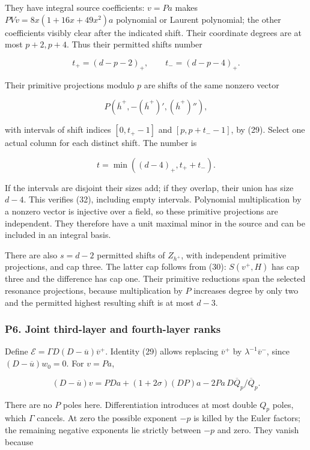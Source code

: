 \documentclass[11pt,a4paper]{article}
\begin{document}
They have integral source coefficients: \(v=Pa\) makes \(PVv=8x(1+16x+49x^{2})a\) polynomial or Laurent polynomial; the other coefficients visibly clear after the indicated shift. Their coordinate degrees are at most \(p+2,p+4\). Thus their permitted shifts number

\[
t_+=(d-p-2)_+,\qquad t_-=(d-p-4)_+.
\]

Their primitive projections modulo \(p\) are shifts of the same nonzero vector

\[
P(\overline h^+,-(\overline h^+)',(\overline h^+)''),
\]

with intervals of shift indices \([0,t_{+}-1]\) and \([p,p+t_{-}-1]\), by (29). Select one actual column for each distinct shift. The number is

\[
t=\min((d-4)_+,t_++t_-).\tag{32}
\]

If the intervals are disjoint their sizes add; if they overlap, their union has size \(d-4\). This verifies (32), including empty intervals. Polynomial multiplication by a nonzero vector is injective over a field, so these primitive projections are independent. They therefore have a unit maximal minor in the source and can be included in an integral basis.

There are also \(s=d-2\) permitted shifts of \(Z_{h^{+}}\), with independent primitive projections, and cap three. The latter cap follows from (30): \(S(v^{+},H)\) has cap three and the difference has cap one. Their primitive reductions span the selected resonance projections, because multiplication by \(P\) increases degree by only two and the permitted highest resulting shift is at most \(d-3\).

\hypertarget{p6.-joint-third-layer-and-fourth-layer-ranks}{%
\subsubsection{P6. Joint third-layer and fourth-layer ranks}\label{p6.-joint-third-layer-and-fourth-layer-ranks}}

Define \(\mathcal{E}=ΓD(D-\overline{u})\overline{v}^{+}\). Identity (29) allows replacing \(\overline{v}^{+}\) by \(λ^{-1}\overline{v}^{-}\), since \((D-\overline{u})w_{0}=0\). For \(v=Pa\),

\[
(D-\overline u)v=PDa+(1+2\sigma)(DP)a-2Pa\,D\overline Q_p/\overline Q_p.
\]

There are no \(P\) poles here. Differentiation introduces at most double \(Q_p\) poles, which \(Γ\) cancels. At zero the possible exponent \(-p\) is killed by the Euler factors; the remaining negative exponents lie strictly between \(-p\) and zero. They vanish because
\end{document}
